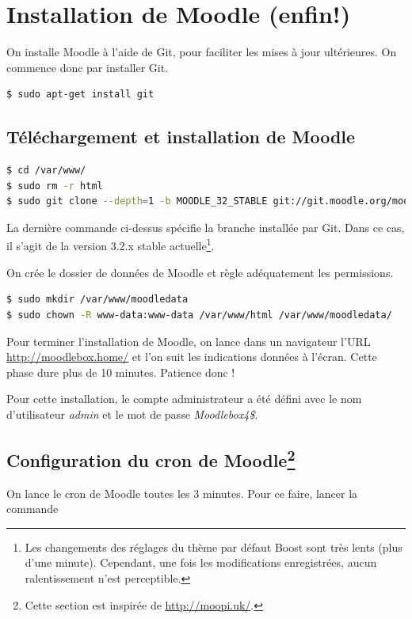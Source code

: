 \documentclass[11pt]{article}
\begin{document}
\section{Installation de Moodle (enfin!)}

On installe Moodle à l'aide de Git, pour faciliter les mises à jour ultérieures. On commence donc par installer Git.

\begin{lstlisting}[language=bash]
$ sudo apt-get install git
\end{lstlisting}

\subsection{Téléchargement et installation de Moodle}

\begin{lstlisting}[language=bash]
$ cd /var/www/
$ sudo rm -r html
$ sudo git clone --depth=1 -b MOODLE_32_STABLE git://git.moodle.org/moodle.git html
\end{lstlisting}
La dernière commande ci-dessus spécifie la branche installée par Git. Dans ce cas, il s'agit de la version 3.2.x stable actuelle\footnote{Les changements des réglages du thème par défaut Boost sont très lents (plus d'une minute). Cependant, une fois les modifications enregistrées, aucun ralentissement n'est perceptible.}.

On crée le dossier de données de Moodle et règle adéquatement les permissions.
\begin{lstlisting}[language=bash]
$ sudo mkdir /var/www/moodledata
$ sudo chown -R www-data:www-data /var/www/html /var/www/moodledata/
\end{lstlisting}

Pour terminer l'installation de Moodle, on lance dans un navigateur l'URL \url{http://moodlebox.home/} et l'on suit les indications données à l'écran. Cette phase dure plus de 10 minutes. Patience donc !

Pour cette installation, le compte administrateur a été défini avec le nom d'utilisateur \emph{admin} et le mot de passe \emph{Moodlebox4\$}.

\subsection[Configuration du cron de Moodle]{Configuration du cron de Moodle\footnote{Cette section est inspirée de \url{http://moopi.uk/}.}}

On lance le cron de Moodle toutes les 3 minutes. Pour ce faire, lancer la commande
\end{document}
